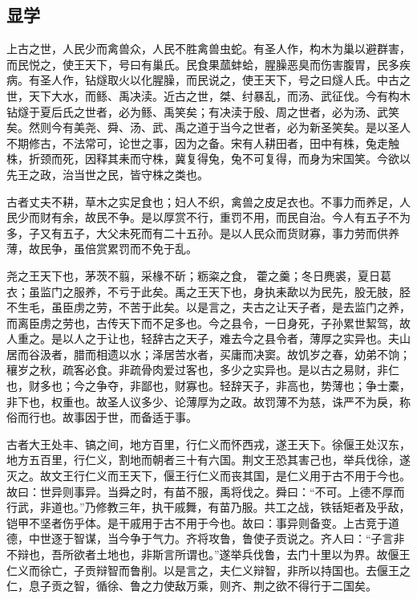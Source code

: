 \documentclass[]{article}
\begin{document}
\hypertarget{header-n1593}{%
\subsection{显学}\label{header-n1593}}

上古之世，人民少而禽兽众，人民不胜禽兽虫蛇。有圣人作，构木为巢以避群害，而民悦之，使王天下，号曰有巢氏。民食果蓏蚌蛤，腥臊恶臭而伤害腹胃，民多疾病。有圣人作，钻燧取火以化腥臊，而民说之，使王天下，号之曰燧人氏。中古之世，天下大水，而鲧、禹决渎。近古之世，桀、纣暴乱，而汤、武征伐。今有构木钻燧于夏后氏之世者，必为鲧、禹笑矣；有决渎于殷、周之世者，必为汤、武笑矣。然则今有美尧、舜、汤、武、禹之道于当今之世者，必为新圣笑矣。是以圣人不期修古，不法常可，论世之事，因为之备。宋有人耕田者，田中有株，兔走触株，折颈而死，因释其耒而守株，冀复得兔，兔不可复得，而身为宋国笑。今欲以先王之政，治当世之民，皆守株之类也。

古者丈夫不耕，草木之实足食也；妇人不织，禽兽之皮足衣也。不事力而养足，人民少而财有余，故民不争。是以厚赏不行，重罚不用，而民自治。今人有五子不为多，子又有五子，大父未死而有二十五孙。是以人民众而货财寡，事力劳而供养薄，故民争，虽倍赏累罚而不免于乱。

尧之王天下也，茅茨不翦，采椽不斫；粝粢之食，藿之羹；冬日麂裘，夏日葛衣；虽监门之服养，不亏于此矣。禹之王天下也，身执耒歃以为民先，股无肢，胫不生毛，虽臣虏之劳，不苦于此矣。以是言之，夫古之让天子者，是去监门之养，而离臣虏之劳也，古传天下而不足多也。今之县令，一日身死，子孙累世絜驾，故人重之。是以人之于让也，轻辞古之天子，难去今之县令者，薄厚之实异也。夫山居而谷汲者，腊而相遗以水；泽居苦水者，买庸而决窦。故饥岁之春，幼弟不饷；穰岁之秋，疏客必食。非疏骨肉爱过客也，多少之实异也。是以古之易财，非仁也，财多也；今之争夺，非鄙也，财寡也。轻辞天子，非高也，势薄也；争士橐，非下也，权重也。故圣人议多少、论薄厚为之政。故罚薄不为慈，诛严不为戾，称俗而行也。故事因于世，而备适于事。

古者大王处丰、镐之间，地方百里，行仁义而怀西戎，遂王天下。徐偃王处汉东，地方五百里，行仁义，割地而朝者三十有六国。荆文王恐其害己也，举兵伐徐，遂灭之。故文王行仁义而王天下，偃王行仁义而丧其国，是仁义用于古不用于今也。故曰：世异则事异。当舜之时，有苗不服，禹将伐之。舜曰：``不可。上德不厚而行武，非道也。''乃修教三年，执干戚舞，有苗乃服。共工之战，铁铦矩者及乎敌，铠甲不坚者伤乎体。是干戚用于古不用于今也。故曰：事异则备变。上古竞于道德，中世逐于智谋，当今争于气力。齐将攻鲁，鲁使子贡说之。齐人曰：``子言非不辩也，吾所欲者土地也，非斯言所谓也。''遂举兵伐鲁，去门十里以为界。故偃王仁义而徐亡，子贡辩智而鲁削。以是言之，夫仁义辩智，非所以持国也。去偃王之仁，息子贡之智，循徐、鲁之力使敌万乘，则齐、荆之欲不得行于二国矣。
\end{document}
